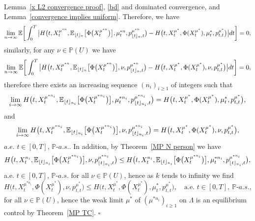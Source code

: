 \documentclass[12pt]{article}
\DeclarePairedDelimiter\floor{\lfloor}{\rfloor}
\theoremstyle{named}
\numberwithin{equation}{section}
\def\P{{\mathord{\mathbb P}}}
\newenvironment{Proof}{\removelastskip\par\medskip \noindent{\em Proof.} \rm}{\penalty-20\null\hfill$\square$\par\medbreak}
\begin{document}
\begin{Proof}
 Lemma~\ref{x L2 convergence proof}, \eqref{bd} and dominated convergence,
  and Lemma~\ref{convergence implies uniform}.
 Therefore, we have
 \begin{equation}
   \nonumber %
  \lim\limits_{{n}\to \infty}\mathbb{E}\bigg[\int_0^T\big| H\bigl(t,X^{\mu^{*n} }_t,\mathbb{E}_{\floor{t}_{n}}\big[\Phi\big(X^{\mu^{*n} }_t\big)\big],\mu^{*n} _t,p^{\mu^{*n} }_{\floor{t}_{n},t}\bigr) - H\bigl(t,X^{\mu^*}_t,\Phi( X^{\mu^*}_t ),\mu^*_t,p^{\mu^*}_{t,t}\bigr)\big| dt\bigg] = 0,
\end{equation}
 similarly, for any $\nu \in \P (U)$ we have
 \begin{equation}
   \nonumber %
  \lim\limits_{{n}\to \infty}\mathbb{E}\bigg[\int_0^T\big| H\bigl(t,X^{\mu^{*n} }_t,\mathbb{E}_{\floor{t}_{n}}\big[\Phi\big(X^{\mu^{*n} }_t\big)\big],\nu,p^{\mu^{*n} }_{\floor{t}_{n},t}\bigr) - H\bigl(t,X^{\mu^*}_t,\Phi( X^{\mu^*}_t ),\nu,p^{\mu^*}_{t,t}\bigr)\big| dt\bigg] = 0,
\end{equation}
therefore there exists an increasing sequence
 $({n_i})_{{i} \geq 1}$ of integers such that
\begin{equation*}
  \lim\limits_{{i}\to \infty} H\bigl(t,X^{\mu^{*n_i} }_t,\mathbb{E}_{\floor{t}_{n_i}}\big[\Phi\big(X^{\mu^{*n_i} }_t\big)\big],\mu^{*n_i}_t,p^{\mu^{*n_i}}_{\floor{t}_{{n_i}},t}\bigr) = H\bigl(t,X^{\mu^*}_t,\Phi( X^{\mu^*}_t ),\mu^*_t,p^{\mu^*}_{t,t}\bigr),
\end{equation*}
and
$$
\lim\limits_{{i}\to \infty} H\bigl(t,X^{\mu^{*n_i} }_t,\mathbb{E}_{\floor{t}_{n_i}}\big[\Phi\big(X^{\mu^{*n_i} }_t\big)\big],\nu,p^{\mu^{*n_i}}_{\floor{t}_{{n_i}},t}\bigr)= H\bigl(t,X^{\mu^*}_t,\Phi( X^{\mu^*}_t ),\nu,p^{\mu^*}_{t,t}\bigr),
$$
$a.e.$ $t \in [0,T]$, $\P$-$a.s.$.
 In addition, by Theorem~\ref{MP N person} we have
\[
H\bigl(t,X^{{n_i}}_t,\mathbb{E}_{\floor{t}_{n_i}}\big[\Phi\big(X^{\mu^{*n_i}}_t\big)\big],\nu,p^{\mu^{*n_i}}_{\floor{t}_{n_i},t}\bigr) \leq H\bigl(t,X^{n_i}_t,\mathbb{E}_{\floor{t}_{n_i}}\big[\Phi\big(X^{\mu^{*n_i}}_t\big)\big],\mu^{*n_i}_t,p^{\mu^{*n_i}}_{\floor{t}_{n_i},t}\bigr),
\]
 a.e. $t \in [0,T]$, $\P$-$a.s.$
for all $\nu \in \P (U)$, hence as $k$ tends to infinity we find
\[
H\bigl(t,X^{\mu^{*n_i} }_t,\Phi( X^{\mu^*}_t ),\nu,p^{\mu^*}_{t,t}\bigr) \leq H\bigl(t,X^{\mu^*}_t,\Phi( X^{\mu^*}_t ),\mu^*_t,p^{\mu^*}_{t,t}\bigr), \quad\text{a.e. } t \in [0,T], \ \P\mbox{-}a.s.,
\]
for all $\nu \in \P (U)$,
hence the weak limit $\mu^*$
 of $(\mu^{*n_i})_{i \geq 1}$
 on $\Lambda$
 is an equilibrium control by Theorem~\ref{MP TC}.
\end{Proof}
\end{document}
